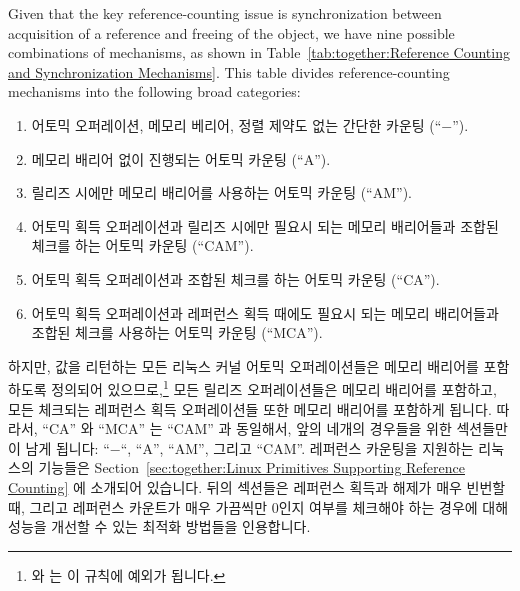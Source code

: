 Given that the key reference-counting issue
is synchronization between acquisition
of a reference and freeing of the object, we have nine possible
combinations of mechanisms, as shown in
Table~\ref{tab:together:Reference Counting and Synchronization Mechanisms}.
This table
divides reference-counting mechanisms into the following broad categories:
\fi
\begin{enumerate}
\item	어토믹 오퍼레이션, 메모리 베리어, 정렬 제약도 없는 간단한 카운팅
	(``$-$'').
\item	메모리 배리어 없이 진행되는 어토믹 카운팅 (``A'').
\item	릴리즈 시에만 메모리 배리어를 사용하는 어토믹 카운팅 (``AM'').
\item	어토믹 획득 오퍼레이션과 릴리즈 시에만 필요시 되는 메모리 배리어들과
	조합된 체크를 하는 어토믹 카운팅 (``CAM'').
\item	어토믹 획득 오퍼레이션과 조합된 체크를 하는 어토믹 카운팅 (``CA'').
\item	어토믹 획득 오퍼레이션과 레퍼런스 획득 때에도 필요시 되는 메모리
	배리어들과 조합된 체크를 사용하는 어토믹 카운팅 (``MCA'').
\iffalse

\item	Simple counting with neither atomic operations, memory
	barriers, nor alignment constraints (``$-$'').
\item	Atomic counting without memory barriers (``A'').
\item	Atomic counting, with memory barriers required only on release
	(``AM'').
\item	Atomic counting with a check combined with the atomic acquisition
	operation, and with memory barriers required only on release
	(``CAM'').
\item	Atomic counting with a check combined with the atomic acquisition
	operation (``CA'').
\item	Atomic counting with a check combined with the atomic acquisition
	operation, and with memory barriers also required on acquisition
	(``MCA'').
\fi
\end{enumerate}
하지만, 값을 리턴하는 모든 리눅스 커널 어토믹 오퍼레이션들은 메모리 배리어를
포함하도록 정의되어 있으므로,\footnote{
	 와  는 이 규칙에 예외가 됩니다.}
모든 릴리즈 오퍼레이션들은 메모리 배리어를 포함하고, 모든 체크되는 레퍼런스
획득 오퍼레이션들 또한 메모리 배리어를 포함하게 됩니다.
따라서, ``CA'' 와 ``MCA'' 는 ``CAM'' 과 동일해서, 앞의 네개의 경우들을 위한
섹션들만이 남게 됩니다:
``$-$``, ``A'', ``AM'', 그리고 ``CAM''.
레퍼런스 카운팅을 지원하는 리눅스의 기능들은
Section~\ref{sec:together:Linux Primitives Supporting Reference Counting} 에
소개되어 있습니다.
뒤의 섹션들은 레퍼런스 획득과 해제가 매우 빈번할 때, 그리고 레퍼런스 카운트가
매우 가끔씩만 0인지 여부를 체크해야 하는 경우에 대해 성능을 개선할 수 있는
최적화 방법들을 인용합니다.
\iffalse

